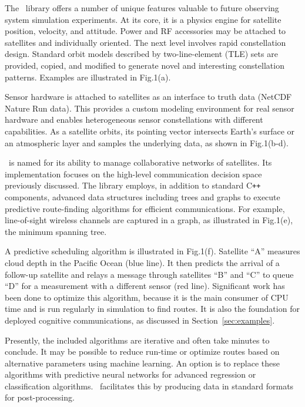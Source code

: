 \documentclass[conference]{IEEEtran}
\newcommand{\project}{{\sc{Collaborate}}~}
\newcommand{\cpp}{C\texttt{++}~}
\begin{document}
The \project library offers a number of unique features valuable to future
observing system simulation experiments.  At its core, it is a physics engine
for satellite position, velocity, and attitude.  Power and RF accessories may be
attached to satellites and individually oriented.  The next level involves rapid
constellation design.  Standard orbit models described by two-line-element (TLE)
sets are provided, copied, and modified to generate novel and interesting
constellation patterns.  Examples are illustrated in Fig.1(a).

Sensor hardware is attached to satellites as an interface to truth data (NetCDF
Nature Run data).  This provides a custom modeling environment for real sensor
hardware and enables heterogeneous sensor constellations with different
capabilities.  As a satellite orbits, its pointing vector intersects Earth's
surface or an atmospheric layer and samples the underlying data, as shown in
Fig.1(b-d).

\project is named for its ability to manage collaborative networks of
satellites.  Its implementation focuses on the high-level communication decision
space previously discussed.  The library employs, in addition to standard \cpp
components, advanced data structures including trees and graphs to execute
predictive route-finding algorithms for efficient communications.  For example,
line-of-sight wireless channels are captured in a graph, as illustrated in
Fig.1(e), the minimum spanning tree.

A predictive scheduling algorithm is illustrated in Fig.1(f).  Satellite ``A''
measures cloud depth in the Pacific Ocean (blue line).  It then predicts the
arrival of a follow-up satellite and relays a message through satellites ``B''
and ``C'' to queue ``D'' for a measurement with a different sensor (red line).
Significant work has been done to optimize this algorithm, because it is the
main consumer of CPU time and is run regularly in simulation to find routes.  It
is also the foundation for deployed cognitive communications, as discussed in
Section~\ref{sec:examples}.

Presently, the included algorithms are iterative and often take minutes to
conclude.  It may be possible to reduce run-time or optimize routes based on
alternative parameters using machine learning.  An option is to replace these
algorithms with predictive neural networks for advanced regression or
classification algorithms.  \project facilitates this by producing data
in standard formats for post-processing.
\end{document}
